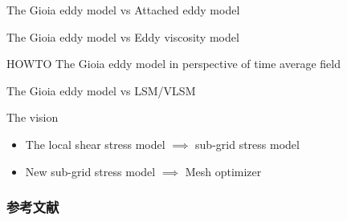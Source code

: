 \documentclass[10pt,xcolor={table,dvipsnames},t]{beamer}
\begin{document}
\begin{frame}{The Gioia eddy model vs Attached eddy model}
    
\end{frame}

\begin{frame}{The Gioia eddy model vs Eddy viscosity model}
    
\end{frame}

\begin{frame}{HOWTO The Gioia eddy model in perspective of time average field}
    
\end{frame}

\begin{frame}{The Gioia eddy model vs LSM/VLSM}
    
\end{frame}

\begin{frame}{The vision}
    \begin{itemize}
        \item The local shear stress model $\implies$ sub-grid stress model
        \item New sub-grid stress model $\implies$ Mesh optimizer
    \end{itemize}
\end{frame}

\begin{frame}[allowframebreaks]
  \frametitle{参考文献}
  \printbibliography[heading=bibliography,title=参考文献]
\end{frame}
\end{document}
